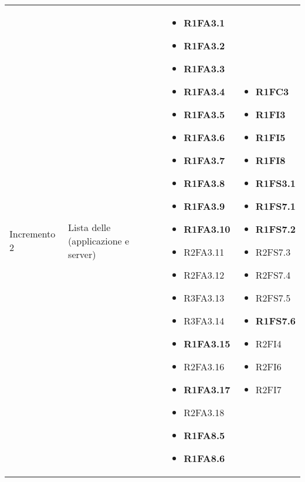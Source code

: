 {\begin{longtable}{C{3cm} C{4cm} C{4cm} C{4cm}}
Incremento 2 & Lista delle  (applicazione e server) & \begin{itemize}
    \item[ ] \textbf{R1FA3.1}
    \item[ ] \textbf{R1FA3.2}
    \item[ ] \textbf{R1FA3.3}
    \item[ ] \textbf{R1FA3.4}
    \item[ ] \textbf{R1FA3.5}
    \item[ ] \textbf{R1FA3.6}
    \item[ ] \textbf{R1FA3.7}
    \item[ ] \textbf{R1FA3.8}
    \item[ ] \textbf{R1FA3.9}
    \item[ ] \textbf{R1FA3.10}
    \item[ ] R2FA3.11
    \item[ ] R2FA3.12
    \item[ ] R3FA3.13
    \item[ ] R3FA3.14
    \item[ ] \textbf{R1FA3.15}
    \item[ ] R2FA3.16
    \item[ ] \textbf{R1FA3.17}
    \item[ ] R2FA3.18 
    \item[ ] \textbf{R1FA8.5}
    \item[ ] \textbf{R1FA8.6}
\end{itemize} & \begin{itemize} 
    \item[ ] \textbf{R1FC3}
    \item[ ] \textbf{R1FI3}
    \item[ ] \textbf{R1FI5}
    \item[ ] \textbf{R1FI8}
    \item[ ] \textbf{R1FS3.1}
    \item[ ] \textbf{R1FS7.1}
    \item[ ] \textbf{R1FS7.2}
    \item[ ] R2FS7.3
    \item[ ] R2FS7.4
    \item[ ] R2FS7.5 
    \item[ ] \textbf{R1FS7.6}
    \item[ ] R2FI4
    \item[ ] R2FI6
    \item[ ] R2FI7
\end{itemize}\\


\end{longtable}}
